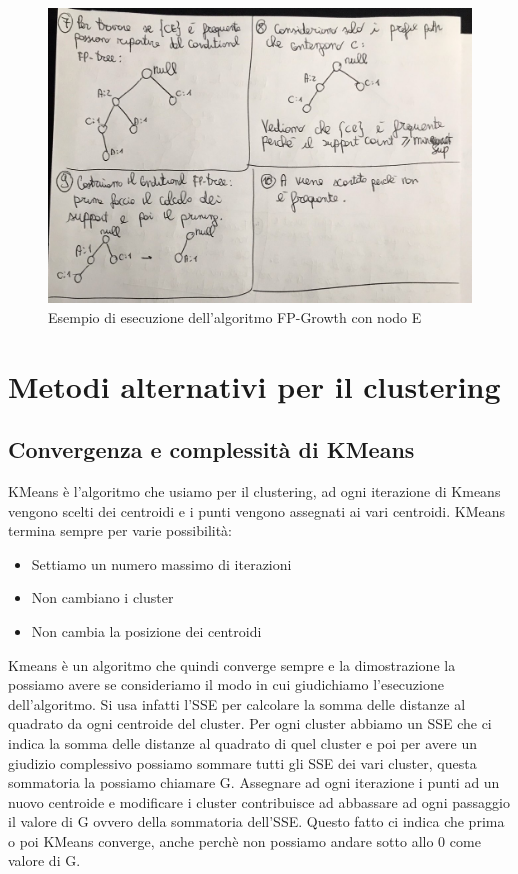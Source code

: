 \documentclass[14pt]{extreport}
\begin{document}
\begin{figure}[h!]
  \includegraphics[width=\linewidth]{FPGrowth2.png}
  \caption{Esempio di esecuzione dell'algoritmo FP-Growth con nodo E}
\end{figure}


\chapter{Metodi alternativi per il clustering}

\section{Convergenza e complessità di KMeans}

KMeans è l'algoritmo che usiamo per il clustering, ad ogni iterazione di Kmeans vengono scelti dei centroidi e i punti vengono assegnati ai vari centroidi.
KMeans termina sempre per varie possibilità:
\begin{itemize}
    \item Settiamo un numero massimo di iterazioni
    \item Non cambiano i cluster
    \item Non cambia la posizione dei centroidi
\end{itemize}

Kmeans è un algoritmo che quindi converge sempre e la dimostrazione la possiamo avere se consideriamo il modo in cui giudichiamo l'esecuzione dell'algoritmo. Si usa infatti l'SSE per calcolare la somma delle distanze al quadrato da ogni centroide del cluster.
Per ogni cluster abbiamo un SSE che ci indica la somma delle distanze al quadrato di quel cluster e poi per avere un giudizio complessivo possiamo sommare tutti gli SSE dei vari cluster, questa sommatoria la possiamo chiamare G.
Assegnare ad ogni iterazione i punti ad un nuovo centroide e modificare i cluster contribuisce ad abbassare ad ogni passaggio il valore di G ovvero della sommatoria dell'SSE.
Questo fatto ci indica che prima o poi KMeans converge, anche perchè non possiamo andare sotto allo 0 come valore di G.
\end{document}
